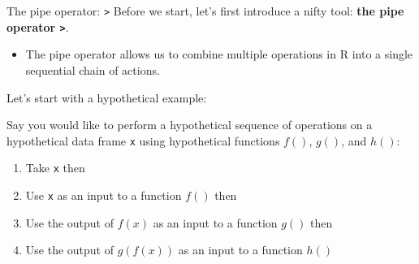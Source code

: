 \documentclass[
  ignorenonframetext,
]{beamer}
\providecommand{\tightlist}{%
  \setlength{\itemsep}{0pt}\setlength{\parskip}{0pt}}
\begin{document}
\begin{frame}[fragile]{The pipe operator:
\texttt{\textbar{}\textgreater{}}}
\protect\hypertarget{the-pipe-operator}{}
Before we start, let's first introduce a nifty tool: \textbf{the pipe
operator \texttt{\textbar{}\textgreater{}}}.

\begin{itemize}
\tightlist
\item
  The pipe operator allows us to combine multiple operations in R into a
  single sequential chain of actions.
\end{itemize}

Let's start with a hypothetical example:

Say you would like to perform a hypothetical sequence of operations on a
hypothetical data frame \texttt{x} using hypothetical functions \(f()\),
\(g()\), and \(h()\):

\begin{enumerate}
\tightlist
\item
  Take \texttt{x} then
\item
  Use \texttt{x} as an input to a function \(f()\) then
\item
  Use the output of \(f(x)\) as an input to a function \(g()\) then
\item
  Use the output of \(g(f(x))\) as an input to a function \(h()\)
\end{enumerate}
\end{frame}
\end{document}
